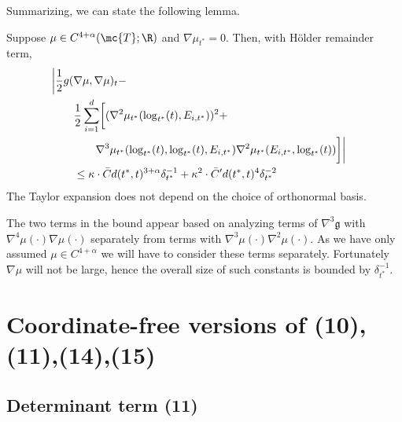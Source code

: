 \documentclass{article}
\begin{document}
Summarizing, we can state the following lemma.
\begin{lemma}
\label{lem:grad:density}
  Suppose $\mu \in C^{4+\alpha}(\mc{T};\R)$ and $\nabla \mu_{t^*}=0$. Then, with H\"older remainder term,
  \begin{equation}
\begin{aligned}
\lefteqn{    \biggl| \frac{1}{2} g(\nabla \mu, \nabla \mu)_t -  } \\
& \qquad  \frac{1}{2}\sum_{i=1}^d \biggl[ (\nabla^2 \mu_{t^*}(\log_{t^*}(t), E_{i,t^*}))^2 + \\
    & \qquad \qquad 
      \nabla^3 \mu_{t^*}(\log_{t^*}(t), \log_{t^*}(t), E_{i,t^*}) \nabla^2 \mu_{t^*}(E_{i,t^*}, \log_{t^*}(t)) \biggr] \biggr| \\
& \qquad \leq \kappa \cdot \bar{C} d(t^*,t)^{3+\alpha} \delta_{t^*}^{-1} +
\kappa^2 \cdot \bar{C}' d(t^*,t)^4 \delta_{t^*}^{-2}
\end{aligned}
    \end{equation}
The Taylor expansion does not depend on the choice of orthonormal basis.
  \end{lemma}
The two terms in the bound appear  based on analyzing terms of $\nabla^3 \mathfrak{g}$ with $\nabla^4 \mu(\cdot) \nabla \mu(\cdot)$ separately from
terms with $\nabla^3 \mu(\cdot) \nabla^2 \mu(\cdot)$. As we have only assumed $\mu \in C^{4+\alpha}$ we will have to consider these terms separately. Fortunately $\nabla \mu$ will not be large, hence the overall size of such constants
is bounded by $\delta_{t^*}^{-1}$.




\section{Coordinate-free versions of (10),(11),(14),(15)}


\subsection{Determinant term (11)}
\end{document}
